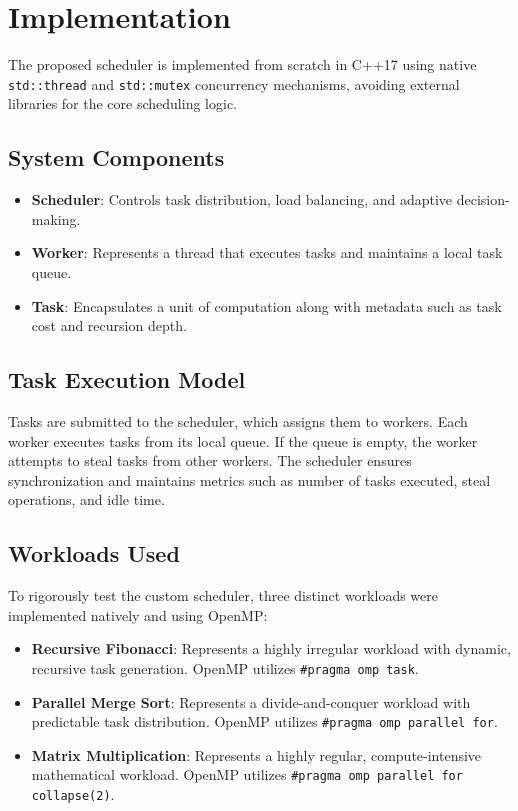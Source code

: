 \documentclass[12pt,a4paper]{article}
\begin{document}
\newpage
\section{Implementation}

The proposed scheduler is implemented from scratch in C++17 using native \texttt{std::thread} and \texttt{std::mutex} concurrency mechanisms, avoiding external libraries for the core scheduling logic.

\subsection{System Components}

\begin{itemize}
\item \textbf{Scheduler}: Controls task distribution, load balancing, and adaptive decision-making.
\item \textbf{Worker}: Represents a thread that executes tasks and maintains a local task queue.
\item \textbf{Task}: Encapsulates a unit of computation along with metadata such as task cost and recursion depth.
\end{itemize}

\subsection{Task Execution Model}

Tasks are submitted to the scheduler, which assigns them to workers. Each worker executes tasks from its local queue. If the queue is empty, the worker attempts to steal tasks from other workers. The scheduler ensures synchronization and maintains metrics such as number of tasks executed, steal operations, and idle time.

\subsection{Workloads Used}

To rigorously test the custom scheduler, three distinct workloads were implemented natively and using OpenMP:

\begin{itemize}
\item \textbf{Recursive Fibonacci}: Represents a highly irregular workload with dynamic, recursive task generation. OpenMP utilizes \texttt{\#pragma omp task}.
\item \textbf{Parallel Merge Sort}: Represents a divide-and-conquer workload with predictable task distribution. OpenMP utilizes \texttt{\#pragma omp parallel for}.
\item \textbf{Matrix Multiplication}: Represents a highly regular, compute-intensive mathematical workload. OpenMP utilizes \texttt{\#pragma omp parallel for collapse(2)}.
\end{itemize}
\end{document}
